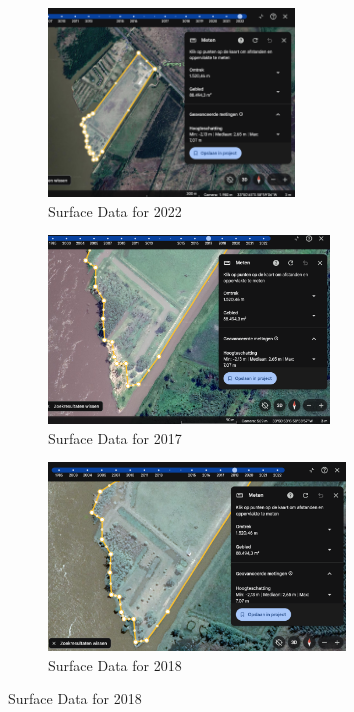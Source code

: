 \begin{figure}[H]
    \centering
    \begin{subfigure}[b]{0.45\textwidth} %
        \includegraphics[width=\linewidth, height=5cm]{figures/appendix-g/opp2022.png}
        \caption{Surface Data for 2022}
        \label{fig:surface2022}
    \end{subfigure}
    \hfill
    \begin{subfigure}[b]{0.45\textwidth} %
        \includegraphics[width=\linewidth, height=5cm]{figures/appendix-g/opp2017.png}
        \caption{Surface Data for 2017}
        \label{fig:surface2017}
    \end{subfigure}
    \hfill
    \begin{subfigure}[b]{0.45\textwidth} %
        \includegraphics[width=\linewidth, height=5cm]{figures/appendix-g/opp2018.png}
        \caption{Surface Data for 2018}
        \label{fig:surface2018}
    \end{subfigure}

\end{figure}
